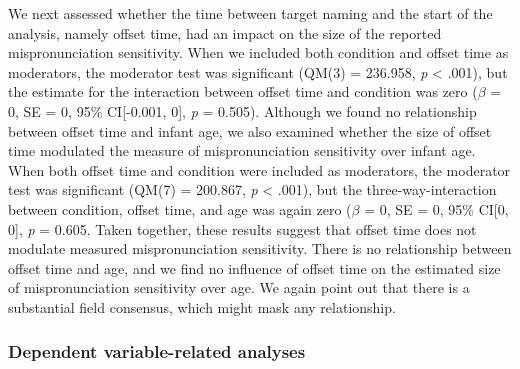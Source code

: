 \documentclass[man]{apa6}
\theoremstyle{definition}
\theoremstyle{definition}
\theoremstyle{definition}
\theoremstyle{remark}
\begin{document}
We next assessed whether the time between target naming and the start of
the analysis, namely offset time, had an impact on the size of the
reported mispronunciation sensitivity. When we included both condition
and offset time as moderators, the moderator test was significant (QM(3)
= 236.958, \emph{p} \textless{} .001), but the estimate for the
interaction between offset time and condition was zero (\(\beta\) = 0,
SE = 0, 95\% CI{[}-0.001, 0{]}, \emph{p} = 0.505). Although we found no
relationship between offset time and infant age, we also examined
whether the size of offset time modulated the measure of
mispronunciation sensitivity over infant age. When both offset time and
condition were included as moderators, the moderator test was
significant (QM(7) = 200.867, \emph{p} \textless{} .001), but the
three-way-interaction between condition, offset time, and age was again
zero (\(\beta\) = 0, SE = 0, 95\% CI{[}0, 0{]}, \emph{p} = 0.605. Taken
together, these results suggest that offset time does not modulate
measured mispronunciation sensitivity. There is no relationship between
offset time and age, and we find no influence of offset time on the
estimated size of mispronunciation sensitivity over age. We again point
out that there is a substantial field consensus, which might mask any
relationship.

\subsubsection{Dependent variable-related
analyses}\label{dependent-variable-related-analyses}
\end{document}
